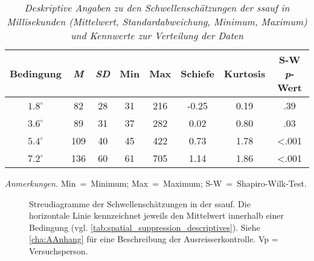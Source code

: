 \documentclass[11pt, twoside, a4paper]{book}		%
\begin{document}
\begin{table}[htbp]
	\centering
	\caption[Deskriptive Angaben zur Schwellenbestimmung in der \gls{ssauf}]{\newline  \textit{Deskriptive Angaben zu den Schwellenschätzungen der \gls{ssauf} in Millisekunden (Mittelwert, Standardabweichung, Minimum, Maximum) und Kennwerte zur Verteilung der Daten} \vspace{.2cm}}
	\label{tab:spatial_suppression_descriptives}

	\begin{threeparttable}
		
		\begin{tabular}{
				c
				S[table-format = 2.0]
				S[table-format = 3.0]
				S[table-format = 2.0]
				S[table-format = 3.0]
				S[table-format = 1.2]
				S[table-format = 1.2]
				S[table-format = <0.3, add-integer-zero=false]
			}
			\hline
			Bedingung 		&	\textit{M}	&	\textit{SD}	&	{Min}	&	Max 	&	\textnormal{Schiefe}	&	\textnormal{Kurtosis}  &{S-W \textit{p}-Wert}\\
			\hline
			$1.8^{\circ}$	&	82			&	28			&	31		&	216		&	-0.25					&	0.19					& 		.39	\\
			$3.6^{\circ}$	&	89			&	31			&	37		&	282		&	0.02					&	0.80					& 		.03	\\
			$5.4^{\circ}$	&	109			&	40			&	45		&	422		&	0.73					&	1.78					& 		<.001	\\
			$7.2^{\circ}$	&	136			&	60			&	61		&	705		&	1.14					&	1.86					& 		<.001	\\
			\hline
		\end{tabular}%
		\begin{tablenotes}[flushleft]
			\footnotesize				%
			\setlength{}	%
			\item \textit{Anmerkungen.} Min~=~Minimum; Max~=~Maximum; S-W~=~Shapiro-Wilk-Test.
		\end{tablenotes}%
	\end{threeparttable}%
\end{table}

\begin{figure}[htbp]
	\centering
	\begin{adjustbox}{width=1\textwidth}
		
	\end{adjustbox}
	\caption[Spatial-Suppression-Streudiagramm]{Streudiagramme der Schwellenschätzungen in der \gls{ssauf}. Die horizontale Linie kennzeichnet jeweils den Mittelwert innerhalb einer Bedingung (vgl. \autoref{tab:spatial_suppression_descriptives}). Siehe \autoref{cha:AAnhang} für eine Beschreibung der Ausreisserkontrolle. Vp = Versuchsperson.}
	\label{fig:spatial_suppression_scatterplot}
\end{figure}
\end{document}
